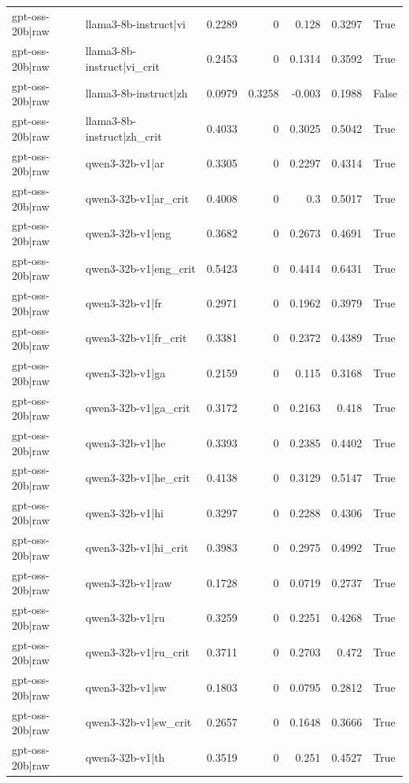 \begin{table}
\begin{tabular}{l l r r r r l}
gpt-oss-20b|raw & llama3-8b-instruct|vi & 0.2289 & 0 & 0.128 & 0.3297 & True \\
gpt-oss-20b|raw & llama3-8b-instruct|vi_crit & 0.2453 & 0 & 0.1314 & 0.3592 & True \\
gpt-oss-20b|raw & llama3-8b-instruct|zh & 0.0979 & 0.3258 & -0.003 & 0.1988 & False \\
gpt-oss-20b|raw & llama3-8b-instruct|zh_crit & 0.4033 & 0 & 0.3025 & 0.5042 & True \\
gpt-oss-20b|raw & qwen3-32b-v1|ar & 0.3305 & 0 & 0.2297 & 0.4314 & True \\
gpt-oss-20b|raw & qwen3-32b-v1|ar_crit & 0.4008 & 0 & 0.3 & 0.5017 & True \\
gpt-oss-20b|raw & qwen3-32b-v1|eng & 0.3682 & 0 & 0.2673 & 0.4691 & True \\
gpt-oss-20b|raw & qwen3-32b-v1|eng_crit & 0.5423 & 0 & 0.4414 & 0.6431 & True \\
gpt-oss-20b|raw & qwen3-32b-v1|fr & 0.2971 & 0 & 0.1962 & 0.3979 & True \\
gpt-oss-20b|raw & qwen3-32b-v1|fr_crit & 0.3381 & 0 & 0.2372 & 0.4389 & True \\
gpt-oss-20b|raw & qwen3-32b-v1|ga & 0.2159 & 0 & 0.115 & 0.3168 & True \\
gpt-oss-20b|raw & qwen3-32b-v1|ga_crit & 0.3172 & 0 & 0.2163 & 0.418 & True \\
gpt-oss-20b|raw & qwen3-32b-v1|he & 0.3393 & 0 & 0.2385 & 0.4402 & True \\
gpt-oss-20b|raw & qwen3-32b-v1|he_crit & 0.4138 & 0 & 0.3129 & 0.5147 & True \\
gpt-oss-20b|raw & qwen3-32b-v1|hi & 0.3297 & 0 & 0.2288 & 0.4306 & True \\
gpt-oss-20b|raw & qwen3-32b-v1|hi_crit & 0.3983 & 0 & 0.2975 & 0.4992 & True \\
gpt-oss-20b|raw & qwen3-32b-v1|raw & 0.1728 & 0 & 0.0719 & 0.2737 & True \\
gpt-oss-20b|raw & qwen3-32b-v1|ru & 0.3259 & 0 & 0.2251 & 0.4268 & True \\
gpt-oss-20b|raw & qwen3-32b-v1|ru_crit & 0.3711 & 0 & 0.2703 & 0.472 & True \\
gpt-oss-20b|raw & qwen3-32b-v1|sw & 0.1803 & 0 & 0.0795 & 0.2812 & True \\
gpt-oss-20b|raw & qwen3-32b-v1|sw_crit & 0.2657 & 0 & 0.1648 & 0.3666 & True \\
gpt-oss-20b|raw & qwen3-32b-v1|th & 0.3519 & 0 & 0.251 & 0.4527 & True \\

\end{tabular}
\end{table}
